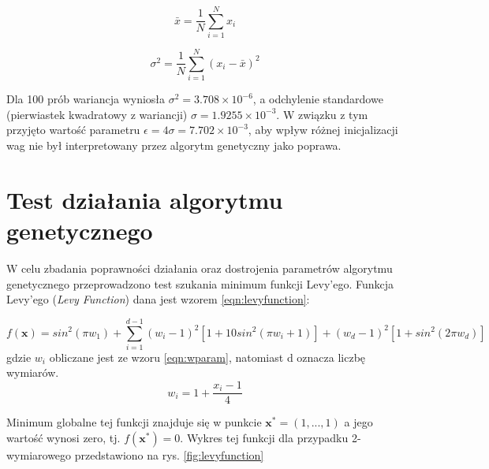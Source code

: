 \begin{equation}\label{eqn:mean}
  \bar{x} = \frac{1}{N} \sum_{i=1}^{N} x_i
\end{equation}

\begin{equation}\label{eqn:variance}
  \sigma^2 = \frac{1}{N} \sum_{i=1}^{N}(x_i - \bar{x})^2
\end{equation}

Dla 100 prób wariancja wyniosła $\sigma^2 =3.708 \times 10^{-6}$, a odchylenie standardowe (pierwiastek kwadratowy z wariancji) $\sigma =1.9255 \times 10^{-3}$.
W związku z tym przyjęto wartość parametru $\epsilon = 4\sigma = 7.702 \times 10^{-3}$, aby wpływ różnej inicjalizacji wag nie był interpretowany przez algorytm genetyczny jako poprawa.

\section{Test działania algorytmu genetycznego}\label{sec:levy_test}
W celu zbadania poprawności działania oraz dostrojenia parametrów algorytmu genetycznego przeprowadzono test szukania minimum funkcji Levy'ego.
Funkcja Levy'ego (\textit{Levy Function}) dana jest wzorem \ref{eqn:levyfunction}:

\begin{equation}\label{eqn:levyfunction}
  f(\mathbf{x}) = sin^2(\pi w_1) + \sum_{i=1}^{d-1} (w_i - 1)^2 [ 1 + 10sin^2(\pi w_i + 1)] + (w_d - 1)^2 [1 + sin^2(2 \pi w_d)]
\end{equation}
gdzie $w_i$ obliczane jest ze wzoru \ref{eqn:wparam}, natomiast d oznacza liczbę wymiarów.
\begin{equation}\label{eqn:wparam}
  w_i = 1 + \frac{x_i - 1}{4}
\end{equation}

Minimum globalne tej funkcji znajduje się w punkcie $ \mathbf{x^*} = (1, ..., 1) $ a jego wartość wynosi zero, tj. $ f(\mathbf{x^*}) = 0 $. \cite{simulationlib}
Wykres tej funkcji dla przypadku 2-wymiarowego przedstawiono na rys. \ref{fig:levyfunction}

